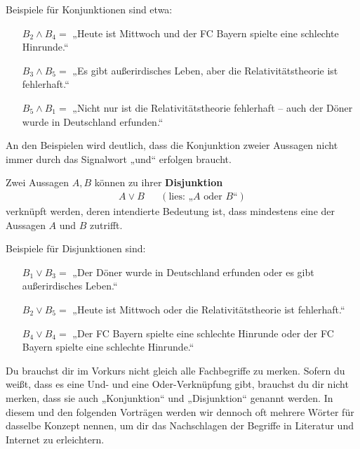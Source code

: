 \begin{bsp}
    Beispiele für Konjunktionen sind etwa:
    \begin{itemize}[labelindent=1.5em, leftmargin=!, labelwidth=]
        \item[$B_2\land B_4 =$] „Heute ist Mittwoch und der FC Bayern spielte eine schlechte Hinrunde.“
        \item[$B_3\land B_5 =$] „Es gibt außerirdisches Leben, aber die Relativitätstheorie ist fehlerhaft.“
        \item[$B_5\land B_1 =$] „Nicht nur ist die Relativitätstheorie fehlerhaft -- auch der Döner wurde in Deutschland erfunden.“
    \end{itemize}
    An den Beispielen wird deutlich, dass die Konjunktion zweier Aussagen nicht immer durch das Signalwort „und“ erfolgen braucht. 
\end{bsp}
	
	
\begin{defin} 
    Zwei Aussagen $A,B$ können zu ihrer \textbf{Disjunktion}
    \begin{align*}
        A\lor B && (\text{lies: „$A$ oder $B$“})
    \end{align*}
    verknüpft werden, deren intendierte Bedeutung ist, dass mindestens eine der Aussagen $A$ und $B$ zutrifft.
\end{defin}
    

\begin{bsp}
    Beispiele für Disjunktionen sind:
    \begin{itemize}[labelindent=1.5em, leftmargin=!, labelwidth=]
        \item[$B_1 \lor B_3 =$] „Der Döner wurde in Deutschland erfunden oder es gibt außerirdisches Leben.“
        \item[$B_2\lor B_5 =$] „Heute ist Mittwoch oder die Relativitätstheorie ist fehlerhaft.“
        \item[$B_4\lor B_4=$] „Der FC Bayern spielte eine schlechte Hinrunde oder der FC Bayern spielte eine schlechte Hinrunde.“
    \end{itemize}
\end{bsp}

		
\begin{bem}[Fachbegriffe]
    Du brauchst dir im Vorkurs nicht gleich alle Fachbegriffe zu merken. Sofern du weißt, dass es eine Und- und eine Oder-Verknüpfung gibt, brauchst du dir nicht merken, dass sie auch „Konjunktion“ und „Disjunktion“ genannt werden. In diesem und den folgenden Vorträgen werden wir dennoch oft mehrere Wörter für dasselbe Konzept nennen, um dir das Nachschlagen der Begriffe in Literatur und Internet zu erleichtern.
\end{bem}

